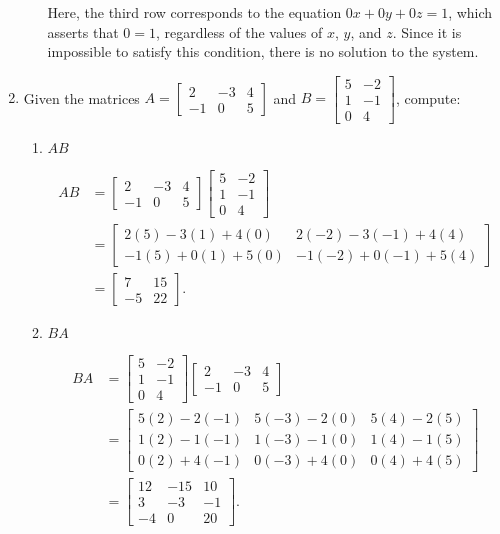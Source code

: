 \documentclass[12pt]{article}
\newcommand{\points}[1]{\marginpar{\hspace{24pt}[#1]}}
\newcommand{\bbm}{\begin{bmatrix}}
\newcommand{\ebm}{\end{bmatrix}}
\begin{document}
\begin{enumerate}
\begin{enumerate}
\bigskip

Here, the third row corresponds to the equation $0x+0y+0z=1$, which asserts that $0=1$, regardless of the values of $x$, $y$, and $z$. Since it is impossible to satisfy this condition, there is no solution to the system.
\end{enumerate}

\newpage

\item Given the matrices $A = \bbm 2&-3&4\\-1&0&5\ebm$ and $B = \bbm 5&-2\\1&-1\\0&4\ebm$, compute:
\begin{enumerate}
 \item $AB$ \points{4}

\bigskip

\begin{align*}
 AB &= \bbm 2&-3&4\\-1&0&5\ebm\bbm 5&-2\\1&-1\\0&4\ebm\\& = \bbm 2(5)-3(1)+4(0) & 2(-2)-3(-1)+4(4)\\-1(5)+0(1)+5(0) & -1(-2)+0(-1)+5(4)\ebm\\& = \bbm 7&15\\-5&22\ebm.
\end{align*}

\bigskip

 \item $BA$ \points{4}

\bigskip

\begin{align*}
 BA &= \bbm 5&-2\\1&-1\\0&4\ebm\bbm 2&-3&4\\-1&0&5\ebm \\&= \bbm 5(2)-2(-1)&5(-3)-2(0) & 5(4)-2(5)\\1(2)-1(-1)&1(-3)-1(0)&1(4)-1(5)\\0(2)+4(-1)&0(-3)+4(0)&0(4)+4(5)\ebm\\& = \bbm 12&-15&10\\3&-3&-1\\-4&0&20\ebm.
\end{align*}

\end{enumerate}

\newpage


\end{enumerate}
\end{document}

